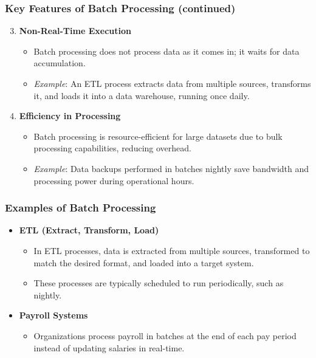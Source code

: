 \documentclass[aspectratio=169]{beamer}
\begin{document}
\begin{frame}[fragile]
    \frametitle{Key Features of Batch Processing (continued)}
    \begin{enumerate}
        \setcounter{enumi}{2} %
        \item \textbf{Non-Real-Time Execution}
            \begin{itemize}
                \item Batch processing does not process data as it comes in; it waits for data accumulation.
                \item \textit{Example}: An ETL process extracts data from multiple sources, transforms it, and loads it into a data warehouse, running once daily.
            \end{itemize}
        \item \textbf{Efficiency in Processing}
            \begin{itemize}
                \item Batch processing is resource-efficient for large datasets due to bulk processing capabilities, reducing overhead.
                \item \textit{Example}: Data backups performed in batches nightly save bandwidth and processing power during operational hours.
            \end{itemize}
    \end{enumerate}
\end{frame}

\begin{frame}[fragile]
    \frametitle{Examples of Batch Processing}
    \begin{itemize}
        \item \textbf{ETL (Extract, Transform, Load)}
            \begin{itemize}
                \item In ETL processes, data is extracted from multiple sources, transformed to match the desired format, and loaded into a target system.
                \item These processes are typically scheduled to run periodically, such as nightly.
            \end{itemize}
        \item \textbf{Payroll Systems}
            \begin{itemize}
                \item Organizations process payroll in batches at the end of each pay period instead of updating salaries in real-time.
            \end{itemize}
    \end{itemize}
\end{frame}
\end{document}
